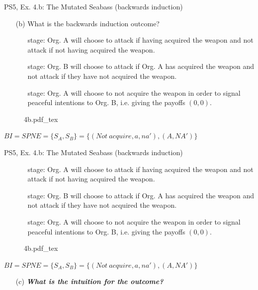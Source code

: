 \begin{frame}{PS5, Ex. 4.b: The Mutated Seabass (backwards induction)}
  \begin{itemize}
    \item[(b)] What is the backwards induction outcome?
    \begin{itemize}\normalsize
      \item[\nth{3} stage:] Org. A will choose to attack if having acquired the weapon and not attack if not having acquired the weapon.
      \item[\nth{2} stage:] Org. B will choose to attack if Org. A has acquired the weapon and not attack if they have not acquired the weapon.
      \item[\nth{1} stage:] Org. A will choose to not acquire the weapon in order to signal peaceful intentions to Org. B, i.e. giving the payoffs $(0,0)$.
    \end{itemize}
  \end{itemize}
  \vspace{-8pt}
  \begin{figure}[!h]
    \center
    \def\svgwidth{\columnwidth}
    {4b.pdf_tex}
  \end{figure}
  \vspace{-4pt}
  $BI=SPNE=\{S_A,S_B\}=\{ (Not\ acquire, a, na'),(A, NA') \}$
  \vfill\null
\end{frame}
\begin{frame}{PS5, Ex. 4.b: The Mutated Seabass (backwards induction)}
  \vspace{-4pt}
  \begin{itemize}
    \item[]
    \begin{itemize}\normalsize
      \item[\nth{3} stage:] Org. A will choose to attack if having acquired the weapon and not attack if not having acquired the weapon.
      \item[\nth{2} stage:] Org. B will choose to attack if Org. A has acquired the weapon and not attack if they have not acquired the weapon.
      \item[\nth{1} stage:] Org. A will choose to not acquire the weapon in order to signal peaceful intentions to Org. B, i.e. giving the payoffs $(0,0)$.
    \end{itemize}
  \end{itemize}
  \vspace{-8pt}
  \begin{figure}[!h]
    \center
    \def\svgwidth{\columnwidth}
    {4b.pdf_tex}
  \end{figure}
  \vspace{-4pt}
  $BI=SPNE=\{S_A,S_B\}=\{ (Not\ acquire, a, na'),(A, NA') \}$
  \vspace{-2pt}
  \begin{itemize}
    \item[(c)] \textbf{\textit{What is the intuition for the outcome?}}
  \end{itemize}
  \vfill\null
\end{frame}

